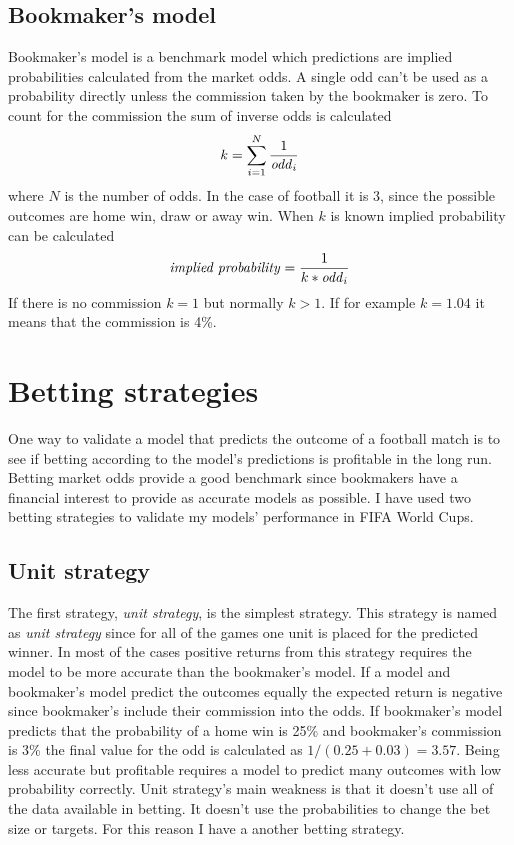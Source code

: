 \subsection{Bookmaker's model}
Bookmaker's model is a benchmark model which predictions are implied probabilities calculated from the market odds. A single odd can't be used as a probability directly unless the commission taken by the bookmaker is zero. To count for the commission the sum of inverse odds is calculated
\begin{equation}
    k = \sum_{i=1}^{N}\frac{1}{\text{\textit{odd}}_i}
\end{equation}
where $N$ is the number of odds. In the case of football it is 3, since the possible outcomes are home win, draw or away win.
When $k$ is known implied probability can be calculated
\begin{equation}
    \text{\textit{implied probability}} = \frac{1}{k *\text{\textit{odd}}_i}
\end{equation}
If there is no commission $k=1$ but normally $k>1$. If for example $k=1.04$ it means that the commission is 4\%.

\section{Betting strategies}
One way to validate a model that predicts the outcome of a football match is to see if betting according to the model's predictions is profitable in the long run. Betting market odds provide a good benchmark since bookmakers have a financial interest to provide as accurate models as possible. I have used two betting strategies to validate my models' performance in FIFA World Cups.

\subsection{Unit strategy}
The first strategy, \textit{unit strategy}, is the simplest strategy. This strategy is named as \textit{unit strategy} since for all of the games one unit is placed for the predicted winner. In most of the cases positive returns from this strategy requires the model to be more accurate than the bookmaker's model. If a model and bookmaker's model predict the outcomes equally the expected return is negative since bookmaker's include their commission into the odds. If bookmaker's model predicts that the probability of a home win is 25\% and bookmaker's commission is 3\% the final value for the odd is calculated as $1/(0.25+0.03) = 3.57$. Being less accurate but profitable requires a model to predict many outcomes with low probability correctly. Unit strategy's main weakness is that it doesn't use all of the data available in betting. It doesn't use the probabilities to change the bet size or targets. For this reason I have a another betting strategy.

